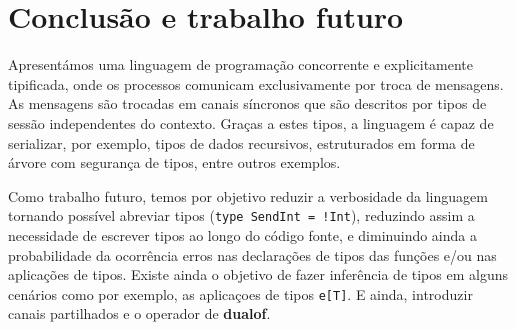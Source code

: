 \section{Conclusão e trabalho futuro}
\lstset{language=CFST, style=eclipse}
Apresentámos uma linguagem de programação concorrente e explicitamente tipificada, onde os processos comunicam exclusivamente por troca de mensagens. As mensagens são trocadas em canais síncronos que são descritos por tipos de sessão independentes do contexto. Graças a estes tipos, a linguagem é capaz de serializar, por exemplo, tipos de dados recursivos, estruturados em forma de árvore com segurança de tipos, entre outros exemplos.

Como trabalho futuro, temos por objetivo reduzir a verbosidade da linguagem tornando possível abreviar tipos (\lstinline{type SendInt = !Int}), reduzindo assim a necessidade de escrever tipos ao longo do código fonte, e diminuindo ainda a probabilidade da ocorrência erros nas declarações de tipos das funções e/ou nas aplicações de tipos.
Existe ainda o objetivo de fazer inferência de tipos em alguns cenários como por exemplo, as aplicaçoes de tipos \lstinline|e[T]|. E ainda, introduzir canais partilhados e o operador de \textbf{dualof}.
 

